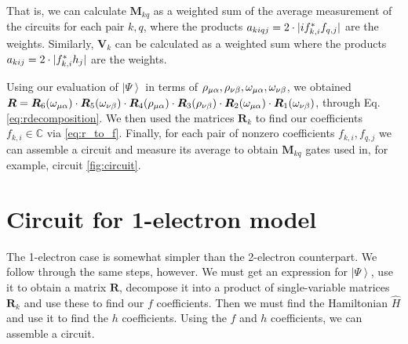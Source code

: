 \documentclass{aux/ttuthes2007}
\newcommand{\ket}[1]{\ensuremath{\left|#1\right\rangle}}
\newcommand{\ind}[1]{{\uo #1 \oo #1}}
\newcommand{\uo}[1]{
		\IfEqCase{#1}{
			{0}{\mu}
			{1}{\nu}
			{2}{\xi}
		}[\PackageError{uo}{Undefined option to uo: #1}{}]
}
\newcommand{\oo}[1]{
		\IfEqCase{#1}{
			{0}{\alpha}
			{1}{\beta}
			{2}{\gamma}
		}[\PackageError{unocorb}{Undefined option to unuo: #1}{}]
}
\DeclarePairedDelimiter\abs{\lvert}{\rvert}
\begin{document}
%
That is, we can calculate $\bm M_{kq}$ as a weighted sum of the average measurement of the circuits for each pair $k, q$, where the products $a_{kiqj} = 2\cdot \abs{if_{k, i}^*f_{q, j}}$ are the weights.
Similarly, $\bm V_k$ can be calculated as a weighted sum where the products $a_{kij} = 2\cdot \abs{f_{k, i}^*h_j}$ are the weights.

Using our evaluation of $\ket\Psi$ in terms of $\rho_\ind 0, \rho_\ind 1, \omega_\ind 0, \omega_\ind 1$, we obtained 
$\bm R = 
\bm R_6(\omega_\ind 0) \cdot
\bm R_5(\omega_\ind 1) \cdot
\bm R_4(\rho_\ind 0) \cdot
\bm R_3(\rho_\ind 1) \cdot
\bm R_2(\omega_\ind 0) \cdot
\bm R_1(\omega_\ind 1)
$, through Eq. \ref{eq:rdecomposition}.
%
We then used the matrices $\bm R_k$ to find our coefficients $f_{k, i} \in \mathbb{C}$ via \ref{eq:r_to_f}. Finally, for each pair of nonzero coefficients $f_{k, i}, f_{q, j}$ we can assemble a circuit and measure its average to obtain $\bm M_{kq}$ gates used in, for example, circuit \ref{fig:circuit}.


\section {\textbf{Circuit for 1-electron model}}

The 1-electron case is somewhat simpler than the 2-electron counterpart. We follow through the same steps, however. We must get an expression for $\ket \Psi$, use it to obtain a matrix $\bm R$, decompose it into a product of single-variable matrices $\bm R_k$ and use these to find our $f$ coefficients. Then we must find the Hamiltonian $\hat H$ and use it to find the $h$ coefficients. Using the $f$ and $h$ coefficients, we can assemble a circuit.
%
\end{document}
